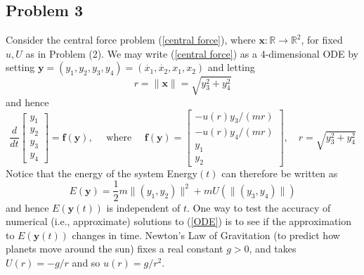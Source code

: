 \documentclass{article}
\newcommand{\R}{{\mathbb R}}
\begin{document}
\subsection*{Problem 3}
Consider the central force problem (\ref{central force}),
where $\mathbf{x} \colon \R \to \R^2$, for fixed $u,U$ as in Problem (2).
We may write (\ref{central force}) as a 4-dimensional ODE by setting
$\mathbf{y} = (y_1,y_2,y_3,y_4) = (\dot{x_1},\dot{x_2},x_1,x_2)$ and letting
\[
	r = \lVert \mathbf{x} \rVert = \sqrt{y_3^2 + y_4^2}
\]
and hence
\begin{equation}\label{ODE}
	\frac{d}{dt} \begin{bmatrix} y_1 \\ y_2 \\ y_3 \\ y_4 \end{bmatrix} = \mathbf{f}(\mathbf{y}),
	\quad \text{ where } \quad
	\mathbf{f}(\mathbf{y}) =
	\begin{bmatrix} -u(r)y_3/(mr) \\ -u(r)y_4/(mr) \\ y_1 \\ y_2 \end{bmatrix},
	\quad r = \sqrt{y_3^2 + y_4^2}
\end{equation}
Notice that the energy of the system Energy$(t)$ can therefore be written as
\[
	E(\mathbf{y}) = \frac12 m\lVert(y_1,y_2)\rVert^2
	+ mU(\lVert (y_3,y_4)\rVert)
\]
and hence $E(\mathbf{y}(t))$ is independent of $t$.
One way to test the accuracy of numerical (i.e., approximate)
solutions to (\ref{ODE}) is to see if the approximation to $E(\mathbf{y}(t))$ changes in time.
Newton's Law of Gravitation (to predict how planets move around the sun)
fixes a real constant $g > 0$, and takes $U(r) = -g/r$
and so $u(r) = g/r^2$.
\end{document}
